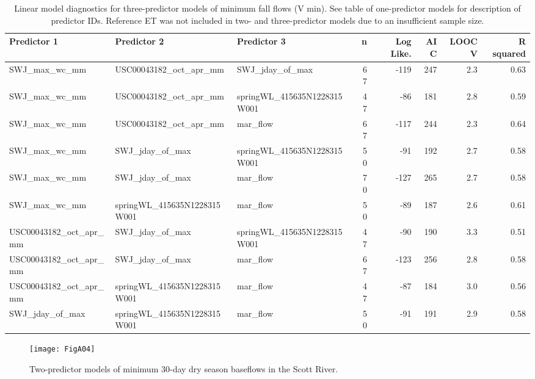 \documentclass[hess, manuscript]{copernicus}
\begin{document}
\begin{table}[ht]
\centering
\caption{Linear model diagnostics for three-predictor models of minimum fall flows (V min). See table of one-predictor models for description of predictor IDs. Reference ET was not included in two- and three-predictor models due to an insufficient sample size.} 
\label{tab:vmin_tab_3pred}
\begingroup\fontsize{8pt}{9pt}\selectfont
\begin{tabular}{lllrrrrr}
  \hline
Predictor 1 & Predictor 2 & Predictor 3 & n & Log Like. & AIC & LOOCV & R squared \\ 
  \hline
SWJ\_max\_wc\_mm & USC00043182\_oct\_apr\_mm & SWJ\_jday\_of\_max & 67 & -119 & 247 & 2.3 & 0.63 \\ 
  SWJ\_max\_wc\_mm & USC00043182\_oct\_apr\_mm & springWL\_415635N1228315W001 & 47 & -86 & 181 & 2.8 & 0.59 \\ 
  SWJ\_max\_wc\_mm & USC00043182\_oct\_apr\_mm & mar\_flow & 67 & -117 & 244 & 2.3 & 0.64 \\ 
  SWJ\_max\_wc\_mm & SWJ\_jday\_of\_max & springWL\_415635N1228315W001 & 50 & -91 & 192 & 2.7 & 0.58 \\ 
  SWJ\_max\_wc\_mm & SWJ\_jday\_of\_max & mar\_flow & 70 & -127 & 265 & 2.7 & 0.58 \\ 
  SWJ\_max\_wc\_mm & springWL\_415635N1228315W001 & mar\_flow & 50 & -89 & 187 & 2.6 & 0.61 \\ 
  USC00043182\_oct\_apr\_mm & SWJ\_jday\_of\_max & springWL\_415635N1228315W001 & 47 & -90 & 190 & 3.3 & 0.51 \\ 
  USC00043182\_oct\_apr\_mm & SWJ\_jday\_of\_max & mar\_flow & 67 & -123 & 256 & 2.8 & 0.58 \\ 
  USC00043182\_oct\_apr\_mm & springWL\_415635N1228315W001 & mar\_flow & 47 & -87 & 184 & 3.0 & 0.56 \\ 
  SWJ\_jday\_of\_max & springWL\_415635N1228315W001 & mar\_flow & 50 & -91 & 191 & 2.9 & 0.58 \\ 
   \hline
\end{tabular}
\endgroup
\end{table}

\begin{figure}
\texttt{[image: FigA04]} \caption{\label{fig:two_predictor_model} Two-predictor models of minimum 30-day dry season baseflows in the Scott River.}\label{fig:two_predictor_model}
\end{figure}
\end{document}

